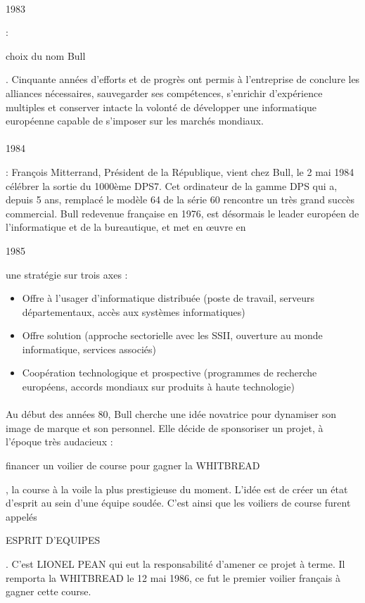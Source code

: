 \documentclass{article}
\begin{document}
		\paragraph{}
		\begin{bf}1983\end{bf}: \begin{bf}choix du nom Bull\end{bf}. Cinquante années d’efforts et de progrès ont permis à 
		l’entreprise de conclure les alliances nécessaires, sauvegarder ses compétences, s’enrichir d’expérience multiples et 
		conserver intacte la volonté de développer une informatique européenne capable de s’imposer sur les marchés mondiaux.
		\paragraph{}
		\begin{bf}1984\end{bf}: François Mitterrand, Président de la République, vient chez Bull, le 2 mai 1984 célébrer la 
		sortie du 1000ème DPS7. Cet ordinateur de la gamme DPS qui a, depuis 5 ans, remplacé le modèle 64 de la série 60 
		rencontre un très grand succès commercial. Bull redevenue française en 1976, est désormais le leader européen de 
		l’informatique et de la bureautique, et met en œuvre en \begin{bf}1985\end{bf} une stratégie sur trois axes :
		\begin{itemize}
			\item Offre à l’usager d’informatique distribuée (poste de travail, serveurs départementaux, accès aux systèmes 
			informatiques)
			\item Offre solution (approche sectorielle avec les SSII, ouverture au monde informatique, services associés)
			\item Coopération technologique et prospective (programmes de recherche européens, accords mondiaux sur produits 
			à haute technologie)
		\end{itemize}
		\paragraph{}
		Au début des années 80, Bull cherche une idée novatrice pour dynamiser son image de marque et son personnel. 
		Elle décide de sponsoriser un projet, à l'époque très audacieux : \begin{bf}financer un voilier de course pour gagner 
		la WHITBREAD\end{bf}, la course à la voile la plus prestigieuse du moment. L'idée est de créer un état d'esprit au 
		sein d'une équipe soudée. C'est ainsi que les voiliers de course furent appelés \begin{bf}ESPRIT D'EQUIPES\end{bf}. 
		C'est LIONEL PEAN qui eut la responsabilité d'amener ce projet à terme. Il remporta la WHITBREAD le 12 mai 1986, ce 
		fut le premier voilier français à gagner cette course.
\end{document}
